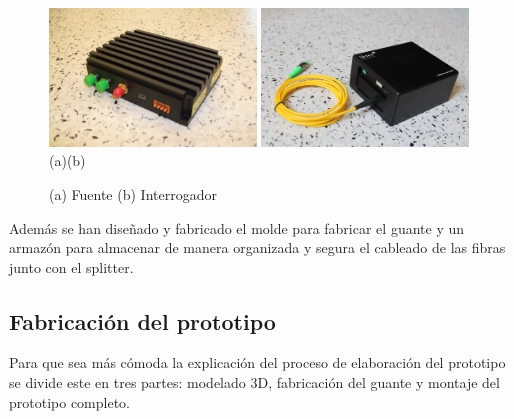 \begin{itemize}
\begin{figure}[H]
	\centering
	\includegraphics[width=0.49\textwidth]{./img/fuente}
	\includegraphics[width=0.49\textwidth]{./img/interrogador} 
	\\(a)\hspace{7cm}(b)
	\caption{(a) Fuente \cite{fuente} (b) Interrogador \cite{interrogador}} 
	\label{fig:FuenteInterrogador}
\end{figure}


 
\end{itemize}

Además se han diseñado y fabricado el molde para fabricar el guante y  un armazón para almacenar de manera organizada y segura el cableado de las fibras junto con el splitter.




\subsection{Fabricación del prototipo}
\label{sec:proceso3}
 
 
Para que sea más cómoda la explicación del proceso de elaboración del prototipo se divide este en tres partes: modelado 3D, fabricación del guante y montaje del prototipo completo.

